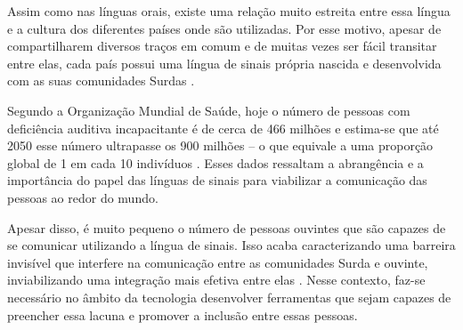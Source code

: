Assim como nas línguas orais, existe uma relação muito estreita entre essa língua e a cultura dos diferentes países onde são utilizadas. Por esse motivo, apesar de compartilharem diversos traços em comum e de muitas vezes ser fácil transitar entre elas, cada país possui uma língua de sinais própria nascida e desenvolvida com as suas comunidades Surdas \cite{pereira-choi-2011}.


Segundo a Organização Mundial de Saúde, hoje o número de pessoas com deficiência auditiva incapacitante é de cerca de 466 milhões e estima-se que até 2050 esse número ultrapasse os 900 milhões -- o que equivale a uma proporção global de 1 em cada 10 indivíduos \cite{who-2018}. Esses dados ressaltam a abrangência e a importância do papel das línguas de sinais para viabilizar a comunicação das pessoas ao redor do mundo. 



Apesar disso, é muito pequeno o número de pessoas ouvintes que são capazes de se comunicar utilizando a língua de sinais. Isso acaba caracterizando uma barreira invisível que interfere na comunicação entre as comunidades Surda e ouvinte, inviabilizando uma integração mais efetiva entre elas \cite{peres-2006}. Nesse contexto, faz-se necessário no âmbito da tecnologia desenvolver ferramentas que sejam capazes de preencher essa lacuna e promover a inclusão entre essas pessoas. 


